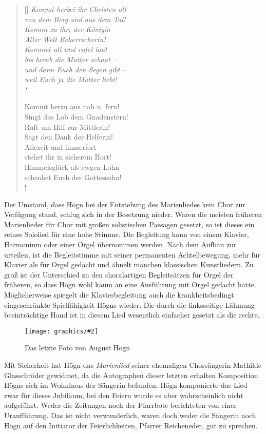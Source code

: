 \documentclass{book}
\newcommand{\img}[2][width=\linewidth]{\noindent\texttt{[image: graphics/\#2]}}
\begin{document}
\begin{verse}[\versewidth]
\itshape
Kommt herbei ihr Christen all \\
von dem Berg und aus dem Tal! \\
Kommt zu ihr, der Königin – \\
Aller Welt Beherrscherin!\\
Kommet all und rufet laut – \\
bis herab die Mutter schaut – \\
und dann Euch den Segen gibt – \\
weil Euch ja die Mutter liebt! \\!

Kommt herzu aus nah u. fern! \\
Singt das Lob dem Gnadenstern! \\
Ruft um Hilf zur Mittlerin! \\
Sagt den Dank der Helferin! \\
Allezeit und immerfort \\
stehet ihr in sicherem Hort! \\
Himmelsglück als ewgen Lohn \\
schenket Euch der Gottessohn! \\!
\end{verse}

Der Umstand, dass Högn bei der Entstehung des Marienliedes kein Chor zur
Verfügung stand, schlug sich in der Besetzung nieder. Waren die meisten
früheren Marienlieder für Chor mit großen solistischen Passagen
gesetzt, so ist dieses ein reines Sololied für eine hohe Stimme. Die
Begleitung kann von einem Klavier, Harmonium oder einer Orgel
übernommen werden. Nach dem Aufbau zur urteilen, ist die Begleitstimme
mit seiner permanenten Achtelbewegung, mehr für Klavier als für Orgel
gedacht und ähnelt manchen klassischen Kunstliedern. Zu groß ist der
Unterschied zu den choralartigen Begleitsätzen für Orgel der
früheren, so dass Högn wohl kaum an eine Ausführung mit Orgel gedacht
hatte. Möglicherweise spiegelt die Klavierbegleitung auch die
krankheitsbedingt eingeschränkte Spielfähigkeit Högns wieder. Die durch
die linksseitige Lähmung beeinträchtige Hand ist in diesem Lied
wesentlich einfacher gesetzt als die rechte.

\begin{figure}
\img{Hoegn-letztes-Foto.jpg}
\caption{Das letzte Foto von August Högn}
\end{figure}

Mit Sicherheit hat Högn das \textit{Marienlied} seiner ehemaligen
Chorsängerin Mathilde Glasschröder gewidmet, da die Autographen dieser
letzten erhalten Komposition Högns sich im Wohnhaus der Sängerin
befanden. Högn komponierte das Lied zwar für dieses Jubiläum, bei den
Feiern wurde es aber wahrscheinlich nicht aufgeführt. Weder die
Zeitungen noch der Pfarrbote berichteten von einer Uraufführung. Das
ist nicht verwunderlich, waren doch weder die Sängerin noch Högn auf
den Initiator der Feierlichkeiten, Pfarrer Reicheneder, gut zu
sprechen.
\end{document}
